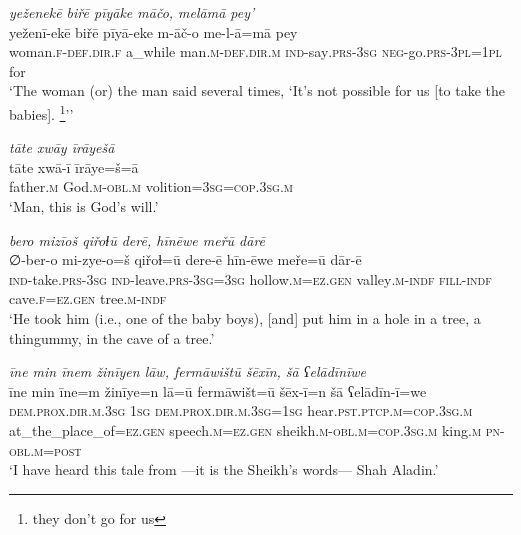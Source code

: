 \ea \label{ZB.33}
\textit{yeženekē biřē pīyāke māčo, melāmā pey’} \\ 
\gll yeženī-ekē biřē pīyā-eke m-āč-o me-l-ā=mā pey \\ 
 woman\textsc{.f}\textsc{-def}\textsc{.dir}\textsc{.f} a\_while man\textsc{.m}\textsc{-def}\textsc{.dir}\textsc{.m} \textsc{ind-}say\textsc{.prs}\textsc{-3sg} \textsc{neg-}go\textsc{.prs}\textsc{-3pl}\textsc{=1pl} for \\ 
\glt `The woman (or) the man said several times, ‘It's not possible for us [to take the babies]. \footnote{they don't go for us}’'
\z 
 
\ea \label{ZB.34}
\textit{tāte xwāy īrāyešā} \\ 
\gll tāte xwā-ī īrāye=š=ā \\ 
 father\textsc{.m} God\textsc{.m}\textsc{-obl}\textsc{.m} volition\textsc{=3sg}\textsc{=cop}\textsc{.3sg}\textsc{.m} \\ 
\glt `Man, this is God’s will.'
\z 
 
\ea \label{ZB.36}
\textit{bero mizīoš qiřoɫū derē, hīnēwe meřū dārē} \\ 
\gll ∅-ber-o mi-zye-o=š qiřoɫ=ū dere-ē hīn-ēwe meře=ū dār-ē \\ 
 \textsc{ind-}take\textsc{.prs}\textsc{-3sg} \textsc{ind-}leave\textsc{.prs}\textsc{-3sg}\textsc{=3sg} hollow\textsc{.m}\textsc{\textsc{=ez.gen}} valley\textsc{.m}\textsc{-indf} \textsc{fill}\textsc{-indf} cave\textsc{.f}\textsc{\textsc{=ez.gen}} tree\textsc{.m}\textsc{-indf} \\ 
\glt `He took him (i.e., one of the baby boys), [and] put him in a hole in a tree, a thingummy, in the cave of a tree.'
\z 
 
\ea \label{ZB.37}
\textit{īne min īnem žinīyen lāw, fermāwištū šēxīn, šā ʕelādīnīwe} \\ 
\gll īne min īne=m žinīye=n lā=ū fermāwišt=ū šēx-ī=n šā ʕelādīn-ī=we \\ 
 \textsc{dem.prox}\textsc{.dir}\textsc{.m}\textsc{.3sg} \textsc{1sg} \textsc{dem.prox}\textsc{.dir}\textsc{.m}\textsc{.3sg}\textsc{=\textsc{1sg}} hear\textsc{.pst}\textsc{.ptcp}\textsc{.m}\textsc{=cop}\textsc{.3sg}\textsc{.m} at\_the\_place\_of\textsc{\textsc{=ez.gen}} speech\textsc{.m}\textsc{\textsc{=ez.gen}} sheikh\textsc{.m}\textsc{-obl}\textsc{.m}\textsc{=cop}\textsc{.3sg}\textsc{.m} king\textsc{.m} \textsc{pn}\textsc{-obl}\textsc{.m}\textsc{=\textsc{post}} \\ 
\glt `I have heard this tale from —it is the Sheikh’s words— Shah Aladin.'
\z 
 
